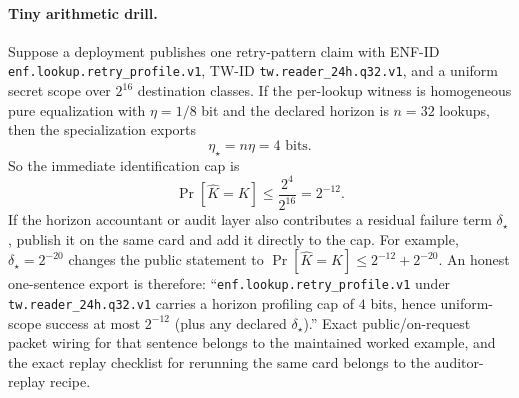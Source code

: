 \documentclass[11pt]{article}
\begin{document}
\paragraph{Tiny arithmetic drill.}
Suppose a deployment publishes one retry-pattern claim with ENF-ID \texttt{enf.lookup.retry\_profile.v1}, TW-ID \texttt{tw.reader\_24h.q32.v1}, and a uniform secret scope over $2^{16}$ destination classes.
If the per-lookup witness is homogeneous pure equalization with $\eta=1/8$ bit and the declared horizon is $n=32$ lookups, then the specialization exports
\[
\eta_\star = n\eta = 4 \text{ bits}.
\]
So the immediate identification cap is
\[
\Pr[\widehat K = K] \le \frac{2^{4}}{2^{16}} = 2^{-12}.
\]
If the horizon accountant or audit layer also contributes a residual failure term $\delta_\star$, publish it on the same card and add it directly to the cap.
For example, $\delta_\star=2^{-20}$ changes the public statement to $\Pr[\widehat K = K] \le 2^{-12}+2^{-20}$.
An honest one-sentence export is therefore: ``\texttt{enf.lookup.retry\_profile.v1} under \texttt{tw.reader\_24h.q32.v1} carries a horizon profiling cap of $4$ bits, hence uniform-scope success at most $2^{-12}$ (plus any declared $\delta_\star$).'' Exact public/on-request packet wiring for that sentence belongs to the maintained worked example, and the exact replay checklist for rerunning the same card belongs to the auditor-replay recipe.\cite{series:workedexample,series:replayrecipe}
\end{document}
